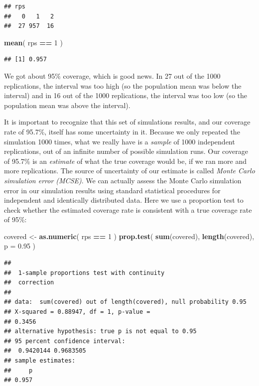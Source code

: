 \documentclass[
]{book}
\newenvironment{Shaded}{\begin{snugshade}}{\end{snugshade}}
\newcommand{\AttributeTok}[1]{\textcolor[rgb]{0.13,0.29,0.53}{#1}}
\newcommand{\DecValTok}[1]{\textcolor[rgb]{0.00,0.00,0.81}{#1}}
\newcommand{\FloatTok}[1]{\textcolor[rgb]{0.00,0.00,0.81}{#1}}
\newcommand{\FunctionTok}[1]{\textcolor[rgb]{0.13,0.29,0.53}{\textbf{#1}}}
\newcommand{\NormalTok}[1]{#1}
\newcommand{\OtherTok}[1]{\textcolor[rgb]{0.56,0.35,0.01}{#1}}
\newcommand{\SpecialCharTok}[1]{\textcolor[rgb]{0.81,0.36,0.00}{\textbf{#1}}}
\begin{document}
\begin{verbatim}
## rps
##   0   1   2 
##  27 957  16
\end{verbatim}

\begin{Shaded}
\begin{Highlighting}[]
\FunctionTok{mean}\NormalTok{( rps }\SpecialCharTok{==} \DecValTok{1}\NormalTok{ )}
\end{Highlighting}
\end{Shaded}

\begin{verbatim}
## [1] 0.957
\end{verbatim}

We got about 95\% coverage, which is good news. In 27 out of the 1000 replications, the interval was too high (so the population mean was below the interval) and in 16 out of the 1000 replications, the interval was too low (so the population mean was above the interval).

It is important to recognize that this set of simulations results, and our coverage rate of 95.7\%, itself has some uncertainty in it.
Because we only repeated the simulation 1000 times, what we really have is a \emph{sample} of 1000 independent replications, out of an infinite number of possible simulation runs.
Our coverage of 95.7\% is an \emph{estimate} of what the true coverage would be, if we ran more and more replications.
The source of uncertainty of our estimate is called \emph{Monte Carlo simulation error (MCSE)}.
We can actually assess the Monte Carlo simulation error in our simulation results using standard statistical procedures for independent and identically distributed data.
Here we use a proportion test to check whether the estimated coverage rate is consistent with a true coverage rate of 95\%:

\begin{Shaded}
\begin{Highlighting}[]
\NormalTok{covered }\OtherTok{\textless{}{-}} \FunctionTok{as.numeric}\NormalTok{( rps }\SpecialCharTok{==} \DecValTok{1}\NormalTok{ )}
\FunctionTok{prop.test}\NormalTok{( }\FunctionTok{sum}\NormalTok{(covered), }\FunctionTok{length}\NormalTok{(covered), }\AttributeTok{p =} \FloatTok{0.95}\NormalTok{ )}
\end{Highlighting}
\end{Shaded}

\begin{verbatim}
## 
##  1-sample proportions test with continuity
##  correction
## 
## data:  sum(covered) out of length(covered), null probability 0.95
## X-squared = 0.88947, df = 1, p-value =
## 0.3456
## alternative hypothesis: true p is not equal to 0.95
## 95 percent confidence interval:
##  0.9420144 0.9683505
## sample estimates:
##     p 
## 0.957
\end{verbatim}
\end{document}
